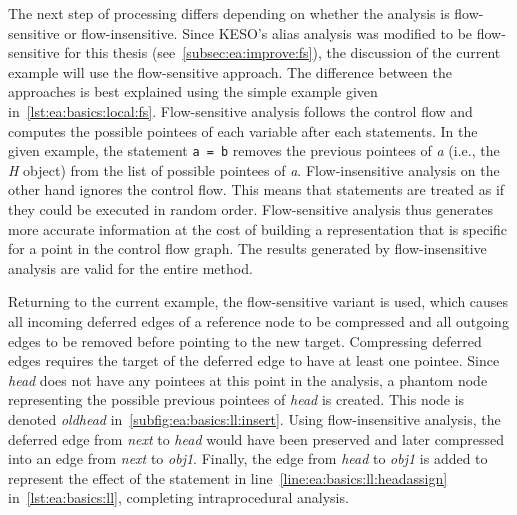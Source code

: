 
			The next step of processing differs depending on whether the analysis is flow-sensitive or flow-insensitive. Since
			KESO's alias analysis was modified to be flow-sensitive for this thesis (see~\cref{subsec:ea:improve:fs}), the
			discussion of the current example will use the flow-sensitive approach. The difference between the approaches is
			best explained using the simple example given in~\cref{lst:ea:basics:local:fs}. Flow-sensitive analysis follows
			the control flow and computes the possible pointees of each variable after each statements. In the given example,
			the statement \texttt{a = b} removes the previous pointees of \emph{a} (i.e., the \emph{H} object) from the list
			of possible pointees of \emph{a}. Flow-insensitive analysis on the other hand ignores the control flow. This means
			that statements are treated as if they could be executed in random order. Flow-sensitive analysis thus generates
			more accurate information at the cost of building a representation that is specific for a point in the control
			flow graph. The results generated by flow-insensitive analysis are valid for the entire method.

			Returning to the current example, the flow-sensitive variant is used, which causes all incoming deferred edges of
			a reference node to be compressed and all outgoing edges to be removed before pointing to the new target.
			Compressing deferred edges requires the target of the deferred edge to have at least one pointee. Since
			\emph{head} does not have any pointees at this point in the analysis, a phantom node representing the possible
			previous pointees of \emph{head} is created. This node is denoted \emph{oldhead}
			in~\cref{subfig:ea:basics:ll:insert}. Using flow-insensitive analysis, the deferred edge from \emph{next} to
			\emph{head} would have been preserved and later compressed into an edge from \emph{next} to \emph{obj1}. Finally,
			the edge from \emph{head} to \emph{obj1} is added to represent the effect of the statement in
			line~\ref{line:ea:basics:ll:headassign} in~\cref{lst:ea:basics:ll}, completing intraprocedural analysis.

